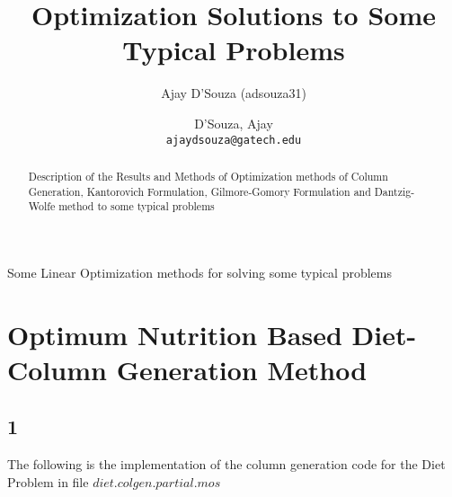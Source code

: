 \documentclass[twoside,12pt]{article}
\title{Optimization Solutions to Some Typical Problems}
\author{Ajay D'Souza (adsouza31)}
\author{
  D'Souza, Ajay\\
  \texttt{ajaydsouza@gatech.edu}
}
\date{}
\begin{document}
\maketitle
\begin{center}
Some Linear Optimization methods for solving some typical problems
\end{center}

\begin{abstract}
Description of the Results and Methods of Optimization methods of Column Generation, Kantorovich Formulation, Gilmore-Gomory Formulation and Dantzig-Wolfe method to some typical problems
\end{abstract}
\pagebreak
\tableofcontents

\pagebreak
\listoffigures
\listoftables

\pagebreak



%
%
\section{Optimum Nutrition Based Diet- Column Generation Method}
\label{p1}

\subsection{1}
\label{p1_q1}

The following is the implementation of the column generation code for the Diet Problem in file $diet.colgen.partial.mos$\\\\
\end{document}
